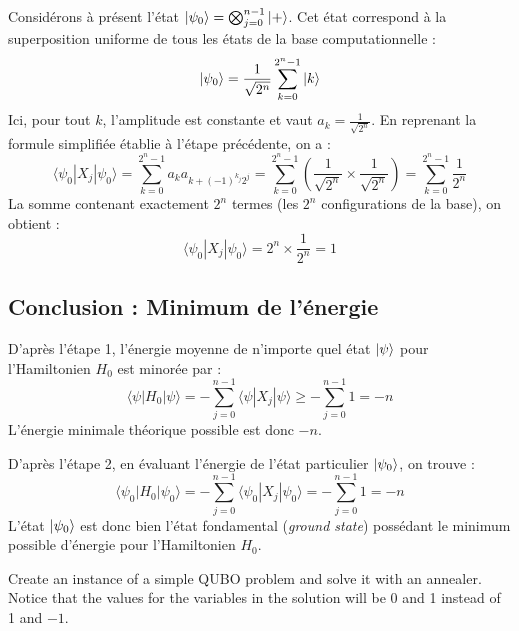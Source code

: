 \documentclass{ceri/sty/rapport}
\newcounter{exercice}[section]
\begin{document}
\begin{solution}
Considérons à présent l'état $\ket{\psi_0} = \bigotimes_{j=0}^{n-1} \ket{+}$. Cet état correspond à la superposition uniforme de tous les états de la base computationnelle :
\[
\ket{\psi_0} = \frac{1}{\sqrt{2^n}} \sum_{k=0}^{2^n-1} \ket{k}
\]
Ici, pour tout $k$, l'amplitude est constante et vaut $a_k = \frac{1}{\sqrt{2^n}}$. En reprenant la formule simplifiée établie à l'étape précédente, on a :
\[
\langle \psi_0 | X_j | \psi_0 \rangle = \sum_{k=0}^{2^n-1} a_k a_{k + (-1)^{k_j}2^j} = \sum_{k=0}^{2^n-1} \left( \frac{1}{\sqrt{2^n}} \times \frac{1}{\sqrt{2^n}} \right) = \sum_{k=0}^{2^n-1} \frac{1}{2^n}
\]
La somme contenant exactement $2^n$ termes (les $2^n$ configurations de la base), on obtient :
\[
\langle \psi_0 | X_j | \psi_0 \rangle = 2^n \times \frac{1}{2^n} = 1
\]

\subsection*{Conclusion : Minimum de l'énergie}

D'après l'étape 1, l'énergie moyenne de n'importe quel état $\ket{\psi}$ pour l'Hamiltonien $H_0$ est minorée par :
\[
\langle \psi | H_0 | \psi \rangle = -\sum_{j=0}^{n-1} \langle \psi | X_j | \psi \rangle \geq -\sum_{j=0}^{n-1} 1 = -n
\]
L'énergie minimale théorique possible est donc $-n$. 

D'après l'étape 2, en évaluant l'énergie de l'état particulier $\ket{\psi_0}$, on trouve :
\[
\langle \psi_0 | H_0 | \psi_0 \rangle = -\sum_{j=0}^{n-1} \langle \psi_0 | X_j | \psi_0 \rangle = -\sum_{j=0}^{n-1} 1 = -n
\]
L'état $\ket{\psi_0}$ est donc bien l'état fondamental (\textit{ground state}) possédant le minimum possible d'énergie pour l'Hamiltonien $H_0$.
\end{solution}


\begin{exercice}[p.~135]
Create an instance of a simple QUBO problem and solve it with an annealer.
Notice that the values for the variables in the solution will be 0 and 1 instead of 1 and $-1$.
\end{exercice}
\end{document}

